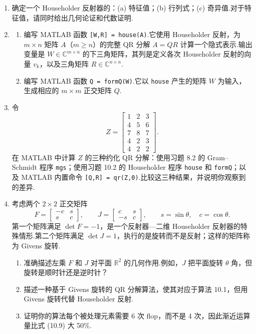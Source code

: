 \documentclass[UTF8,fontset=none,12pt]{ctexart}
\newcommand{\C}{\mathbb{C}}
\newcommand{\R}{\mathbb{R}}
\begin{document}
\begin{enumerate}[label=\textbf{10.\arabic*}]
    \item 确定一个 Householder 反射器的：(a) 特征值；(b) 行列式；(c) 奇异值.对于特征值，请同时给出几何论证和代数证明.

    \item
    \begin{enumerate}[label=(\alph*)]
        \item 编写 MATLAB 函数 \texttt{[W,R] = house(A)}.它使用 Householder 反射，为 $m\times n$ 矩阵 $A$（$m\ge n$）的完整 QR 分解 $A=QR$ 计算一个隐式表示.输出变量是 $W\in\C^{m\times n}$ 的下三角矩阵，其列是定义各次 Householder 反射的向量 $v_k$，以及三角矩阵 $R\in\C^{n\times n}$.
        \item 编写 MATLAB 函数 \texttt{Q = formQ(W)}.它以 \texttt{house} 产生的矩阵 $W$ 为输入，生成相应的 $m\times m$ 正交矩阵 $Q$.
    \end{enumerate}

    \item 令
    \[
        Z=
        \begin{bmatrix}
            1&2&3\\
            4&5&6\\
            7&8&7\\
            4&2&3\\
            4&2&2
        \end{bmatrix}.
    \]
    在 MATLAB 中计算 $Z$ 的三种约化 QR 分解：使用习题 8.2 的 Gram--Schmidt 程序 \texttt{mgs}；使用习题 10.2 的 Householder 程序 \texttt{house} 和 \texttt{formQ}；以及 MATLAB 内置命令 \texttt{[Q,R] = qr(Z,0)}.比较这三种结果，并说明你观察到的差异.

    \item 考虑两个 $2\times2$ 正交矩阵
    \begin{equation}
        F=
        \begin{bmatrix}
            -c&s\\
            s&c
        \end{bmatrix},
        \qquad
        J=
        \begin{bmatrix}
            c&s\\
            -s&c
        \end{bmatrix},
        \qquad
        s=\sin\theta,\quad c=\cos\theta.
        \tag{10.10}
    \end{equation}
    第一个矩阵满足 $\det F=-1$，是一个反射器---二维 Householder 反射器的特殊情形.第二个矩阵满足 $\det J=1$，执行的是旋转而不是反射；这样的矩阵称为 Givens 旋转.
    \begin{enumerate}[label=(\alph*)]
        \item 准确描述左乘 $F$ 和 $J$ 对平面 $\R^2$ 的几何作用.例如，$J$ 把平面旋转 $\theta$ 角，但旋转是顺时针还是逆时针？
        \item 描述一种基于 Givens 旋转的 QR 分解算法，使其对应于算法 10.1，但用 Givens 旋转代替 Householder 反射.
        \item 证明你的算法每个被处理元素需要 6 次 flop，而不是 4 次，因此渐近运算量比式 (10.9) 大 50\%.
    \end{enumerate}
\end{enumerate}
\end{document}
